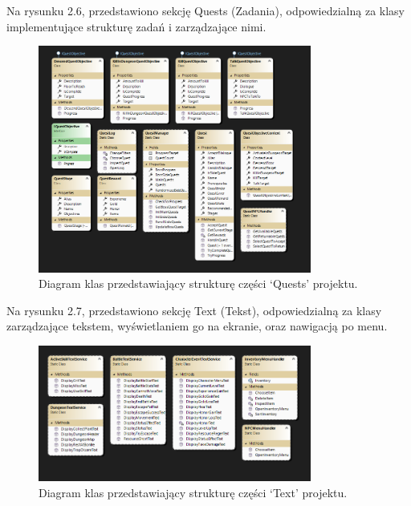 \begin{itemize}
    \begin{minipage}{\linewidth}%
    \item Na rysunku 2.6, przedstawiono sekcję Quests (Zadania), odpowiedzialną za klasy implementujące strukturę zadań i zarządzające nimi.
        \begin{figure}[H]
        \centering
        \includegraphics[width=0.8\textwidth]{figures/class_diagram_quests.png}
        \caption{Diagram klas przedstawiający strukturę części `Quests' projektu.}
        \label{fig:class_diagram_quests}
        \end{figure}
    \end{minipage}

    \begin{minipage}{\linewidth}%
    \item Na rysunku 2.7, przedstawiono sekcję Text (Tekst), odpowiedzialną za klasy zarządzające tekstem, wyświetlaniem go na ekranie, oraz nawigacją po menu.
        \begin{figure}[H]
        \centering
        \includegraphics[width=0.8\textwidth]{figures/class_diagram_text.png}
        \caption{Diagram klas przedstawiający strukturę części `Text' projektu.}
        \label{fig:class_diagram_text}
        \end{figure}
    \end{minipage}


\end{itemize}
